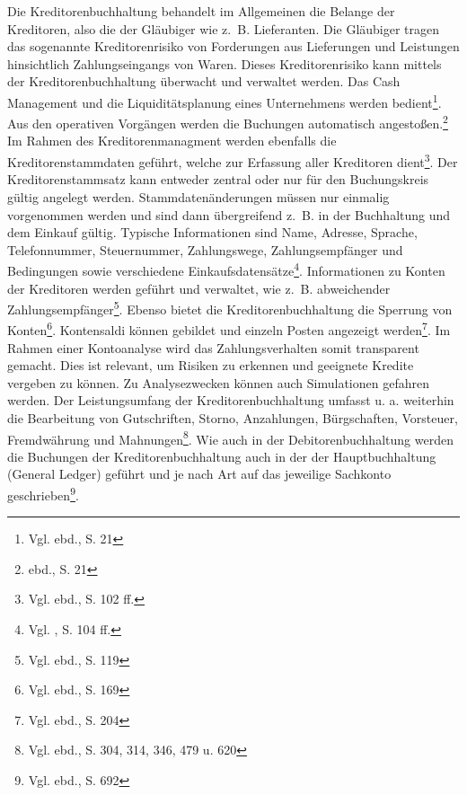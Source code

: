 Die Kreditorenbuchhaltung behandelt im Allgemeinen die Belange der Kreditoren, also die der Gläubiger wie z.~B. Lieferanten. Die Gläubiger tragen das sogenannte Kreditorenrisiko von Forderungen aus Lieferungen und Leistungen hinsichtlich Zahlungseingangs von Waren. Dieses Kreditorenrisiko kann mittels der Kreditorenbuchhaltung überwacht und verwaltet werden. Das Cash Management und die Liquiditätsplanung eines Unternehmens werden bedient\footnote{Vgl. ebd., S. 21}. \glqq Aus den operativen Vorgängen werden die Buchungen automatisch angestoßen.\grqq \footnote{ebd., S. 21} 
Im Rahmen des Kreditorenmanagment werden ebenfalls die Kreditorenstammdaten geführt, welche zur Erfassung aller Kreditoren dient\footnote{Vgl. ebd., S. 102 ff.}. Der Kreditorenstammsatz kann entweder zentral oder nur für den Buchungskreis gültig angelegt werden. Stammdatenänderungen müssen nur einmalig vorgenommen werden und sind dann übergreifend z.~B. in der Buchhaltung und dem Einkauf gültig. Typische Informationen sind Name, Adresse, Sprache, Telefonnummer, Steuernummer, Zahlungswege, Zahlungsempfänger und Bedingungen sowie verschiedene Einkaufsdatensätze\footnote{Vgl. \cite{SAPFIAPAR2001}, S. 104 ff.}.
Informationen zu Konten der Kreditoren werden geführt und verwaltet, wie z.~B. abweichender Zahlungsempfänger\footnote{Vgl. ebd., S. 119}. Ebenso bietet die Kreditorenbuchhaltung die Sperrung von Konten\footnote{Vgl. ebd., S. 169}. Kontensaldi können gebildet und einzeln Posten angezeigt werden\footnote{Vgl. ebd., S. 204}. Im Rahmen einer Kontoanalyse wird das Zahlungsverhalten somit transparent gemacht. Dies ist relevant, um Risiken zu erkennen und geeignete Kredite vergeben zu können. Zu Analysezwecken können auch Simulationen gefahren werden. Der Leistungsumfang der Kreditorenbuchhaltung umfasst u. a. weiterhin die Bearbeitung von Gutschriften, Storno, Anzahlungen, Bürgschaften, Vorsteuer, Fremdwährung und Mahnungen\footnote{Vgl. ebd., S. 304, 314, 346, 479 u. 620}.
Wie auch in der Debitorenbuchhaltung werden die Buchungen der Kreditorenbuchhaltung auch in der der Hauptbuchhaltung (General Ledger) geführt und je nach Art auf das jeweilige Sachkonto geschrieben\footnote{Vgl. ebd., S. 692}.


